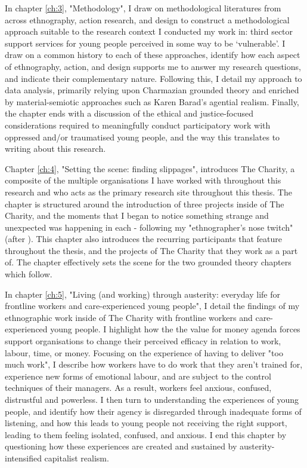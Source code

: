 In chapter \ref{ch:3}, "Methodology", I draw on methodological literatures from across ethnography, action research, and design to construct a methodological approach suitable to the research context I conducted my work in: third sector support services for young people perceived in some way to be `vulnerable'. I draw on a common history to each of these approaches, identify how each aspect of ethnography, action, and design supports me to answer my research questions, and indicate their complementary nature. Following this, I detail my approach to data analysis, primarily relying upon Charmazian grounded theory and enriched by material-semiotic approaches such as Karen Barad's agential realism. Finally, the chapter ends with a discussion of the ethical and justice-focused considerations required to meaningfully conduct participatory work with oppressed and/or traumatised young people, and the way this translates to writing about this research. 

Chapter \ref{ch:4}, "Setting the scene: finding slippages", introduces The Charity, a composite of the multiple organisations I have worked with throughout this research and who acts as the primary research site throughout this thesis. The chapter is structured around the introduction of three projects inside of The Charity, and the moments that I began to notice something strange and unexpected was happening in each - following my "ethnographer's nose twitch" (after \citet[p.  610]{star_ethnography_1999}). This chapter also introduces the recurring participants that feature throughout the thesis, and the projects of The Charity that they work as a part of. The chapter effectively sets the scene for the two grounded theory chapters which follow.

In chapter \ref{ch:5}, "Living (and working) through austerity: everyday life for frontline workers and care-experienced young people", I detail the findings of my ethnographic work inside of The Charity with frontline workers and care-experienced young people. I highlight how the the value for money agenda forces support organisations to change their perceived efficacy in relation to work, labour, time, or money. Focusing on the experience of having to deliver "too much work", I describe how workers have to do work that they aren't trained for, experience new forms of emotional labour, and are subject to the control techniques of their managers. As a result, workers feel anxious, confused, distrustful and powerless.  I then turn to understanding the experiences of young people, and identify how their agency is disregarded through inadequate forms of listening, and how this leads to young people not receiving the right support, leading to them feeling isolated, confused, and anxious. I end this chapter by questioning how these experiences are created and sustained by austerity-intensified capitalist realism.

